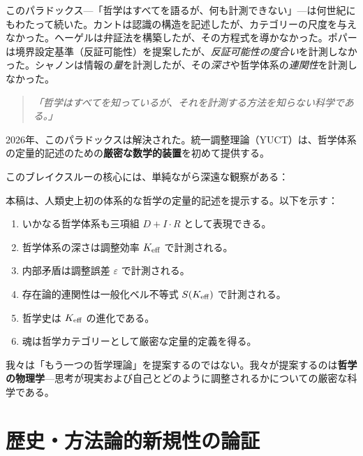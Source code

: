 \documentclass[11pt,a4paper]{article}
\newcommand{\eps}{\varepsilon}
\begin{document}
	このパラドックス—「哲学はすべてを語るが、何も計測できない」—は何世紀にもわたって続いた。カントは認識の構造を記述したが、カテゴリーの尺度を与えなかった。ヘーゲルは弁証法を構築したが、その方程式を導かなかった。ポパーは境界設定基準（反証可能性）を提案したが、\emph{反証可能性の度合い}を計測しなかった。シャノンは情報の\emph{量}を計測したが、その\emph{深さ}や哲学体系の\emph{連関性}を計測しなかった。
	
	\begin{quote}
		\textit{「哲学はすべてを知っているが、それを計測する方法を知らない科学である。」}
	\end{quote}
	
	2026年、このパラドックスは解決された。統一調整理論（YUCT）は、哲学体系の定量的記述のための\textbf{厳密な数学的装置}を初めて提供する。
	
	このブレイクスルーの核心には、単純ながら深遠な観察がある：
	
	\begin{center}
	\end{center}
	
	本稿は、人類史上初の体系的な哲学の定量的記述を提示する。以下を示す：
	
	\begin{enumerate}
		\item いかなる哲学体系も三項組 \(D + I \cdot R\) として表現できる。
		\item 哲学体系の深さは調整効率 \(\Keff\) で計測される。
		\item 内部矛盾は調整誤差 \(\eps\) で計測される。
		\item 存在論的連関性は一般化ベル不等式 \(S(\Keff)\) で計測される。
		\item 哲学史は \(\Keff\) の進化である。
		\item 魂は哲学カテゴリーとして厳密な定量的定義を得る。
	\end{enumerate}
	
	我々は「もう一つの哲学理論」を提案するのではない。我々が提案するのは\textbf{哲学の物理学}—思考が現実および自己とどのように調整されるかについての厳密な科学である。
	
	\section{歴史・方法論的新規性の論証}
	
\end{document}
